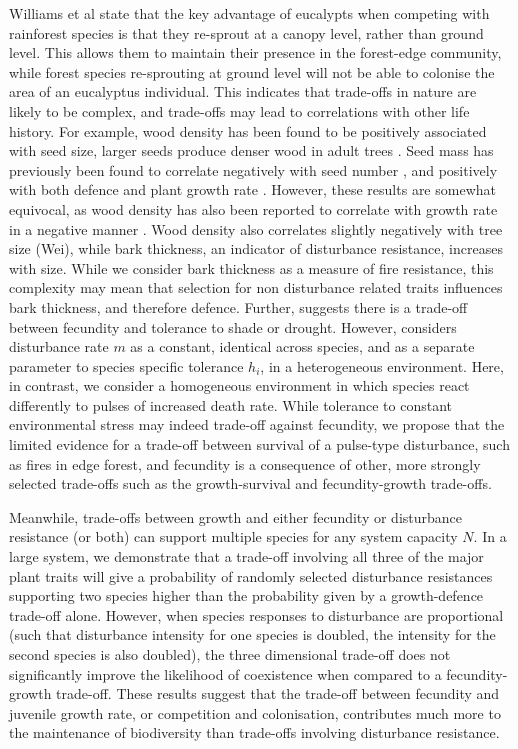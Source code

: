 \documentclass[a4paper]{article}
\begin{document}
Williams et al state that the key advantage of eucalypts when competing with rainforest species is that they re-sprout at a canopy level, rather than ground level. This allows them to maintain their presence in the forest-edge community, while forest species re-sprouting at ground level will not be able to colonise the area of an eucalyptus individual. This indicates that trade-offs in nature are likely to be complex, and trade-offs may lead to correlations with other life history. For example, wood density has been found to be positively associated with seed size, larger seeds produce denser wood in adult trees \cite{ter2001character}. Seed mass has previously been found to correlate negatively with seed number \citep{turnbull1999seed}, and positively with both defence \citep{niklas1992plant} and plant growth rate \citep{gross1984effects}. However, these results are somewhat equivocal, as wood density has also been reported to correlate with growth rate in a negative manner \citep{king2005tree}. Wood density also correlates slightly negatively with tree size (Wei), while bark thickness, an indicator of disturbance resistance, increases with size. While we consider bark thickness as a measure of fire resistance, this complexity may mean that selection for non disturbance related traits influences bark thickness, and therefore defence. Further, \cite{muller2010tolerance} suggests there is a trade-off between fecundity and tolerance to shade or drought. However, \cite{muller2010tolerance} considers disturbance rate $m$ as a constant, identical across species, and as a separate parameter to species specific tolerance $h_i$, in a heterogeneous environment. Here, in contrast, we consider a homogeneous environment in which species react differently to pulses of increased death rate. While tolerance to constant environmental stress may indeed trade-off against fecundity, we propose that the limited evidence for a trade-off between survival of a pulse-type disturbance, such as fires in edge forest, and fecundity is a consequence of other, more strongly selected trade-offs such as the growth-survival and fecundity-growth trade-offs.

Meanwhile, trade-offs between growth and either fecundity or disturbance resistance (or both) can support multiple species for any system capacity $N$. In a large system, we demonstrate that a trade-off involving all three of the major plant traits will give a probability of randomly selected disturbance resistances supporting two species higher than the probability given by a growth-defence trade-off alone. However, when species responses to disturbance are proportional (such that disturbance intensity for one species is doubled, the intensity for the second species is also doubled), the three dimensional trade-off does not significantly improve the likelihood of coexistence when compared to a fecundity-growth trade-off. These results suggest that the trade-off between fecundity and juvenile growth rate, or competition and colonisation, contributes much more to the maintenance of biodiversity than trade-offs involving disturbance resistance.
\end{document}

